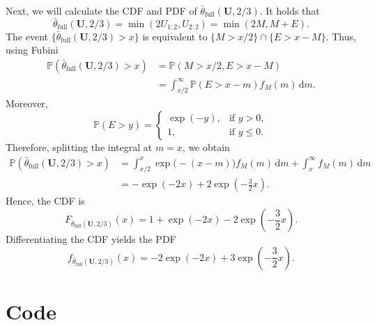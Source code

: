 Next, we will calculate the CDF and PDF of \(\bar{\theta}_{\text{full}}(\mathbf{U},2/3)\).
It holds that
\[
\bar{\theta}_{\text{full}}(\mathbf{U},2/3)
=
\min\left(2U_{1:2},U_{2:2}\right)
=
\min\left(2M,M+E\right).
\]
The event \(\{\bar{\theta}_{\text{full}}(\mathbf{U},2/3)>x\}\) is equivalent to
\(\{M>x/2\}\cap\{E>x-M\}\). Thus, using Fubini
\begin{align*}
	\mathbb{P}\left(\bar{\theta}_{\text{full}}(\mathbf{U},2/3)>x\right)
	&=
	\mathbb{P}(M>x/2,E>x-M)\\
	&=
	\int_{x/2}^{\infty}
	\mathbb{P}(E>x-m)f_M(m)\,\mathrm{d}m.
\end{align*}
Moreover,
\[
\mathbb{P}(E>y)
=
\begin{cases}
	\exp(-y), & \text{if } y>0,\\
	1, & \text{if } y\leq 0.
\end{cases}
\]
Therefore, splitting the integral at \(m=x\), we obtain
\begin{align*}
	\mathbb{P}\left(\bar{\theta}_{\text{full}}(\mathbf{U},2/3)>x\right)
	&=
	\int_{x/2}^{x}\exp\bigl(-(x-m)\bigr)f_M(m)\,\mathrm{d}m
	+
	\int_x^{\infty}f_M(m)\,\mathrm{d}m\\
	&=
	-\exp(-2x)+2\exp\left(-\frac{3}{2}x\right).
\end{align*}
Hence, the CDF is
\[
F_{\bar{\theta}_{\text{full}}(\mathbf{U},2/3)}(x)
=
1+\exp(-2x)-2\exp\left(-\frac{3}{2}x\right).
\]
Differentiating the CDF yields the PDF
\[
f_{\bar{\theta}_{\text{full}}(\mathbf{U},2/3)}(x)
=
-2\exp(-2x)+3\exp\left(-\frac{3}{2}x\right).
\]



\newpage


\section*{Code}


